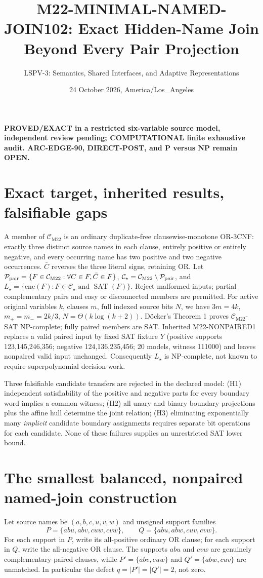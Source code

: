 \documentclass[11pt]{article}
\title{M22-MINIMAL-NAMED-JOIN102: Exact Hidden-Name Join Beyond Every Pair Projection}
\author{LSPV-3: Semantics, Shared Interfaces, and Adaptive Representations}
\date{24 October 2026, America/Los\_Angeles}
\newcommand{\CM}{\mathcal C_{\mathrm{M22}}}
\newcommand{\CS}{\mathcal C_\star}
\begin{document}
\maketitle
\begin{center}\textbf{PROVED/EXACT in a restricted six-variable source model, independent review pending; COMPUTATIONAL finite exhaustive audit. ARC-EDGE-90, DIRECT-POST, and P versus NP remain OPEN.}\end{center}

\section{Exact target, inherited results, falsifiable gaps}
A member of $\CM$ is an ordinary duplicate-free clausewise-monotone OR-3CNF: exactly three distinct source names in each clause, entirely positive or entirely negative, and every occurring name has two positive and two negative occurrences. $\bar C$ reverses the three literal signs, retaining OR. Let $\mathcal P_{\rm pair}=\{F\in\CM:\forall C\in F,\bar C\in F\}$, $\CS=\CM\setminus\mathcal P_{\rm pair}$, and $L_\star=\{\mathrm{enc}(F):F\in\CS\text{ and }\operatorname{SAT}(F)\}$. Reject malformed inputs; partial complementary pairs and easy or disconnected members are permitted. For active original variables $k$, clauses $m$, full indexed source bits $N$, we have $3m=4k$, $m_+=m_-=2k/3$, $N=\Theta(k\log(k+2))$. D\"ocker's Theorem 1 proves $\CM$-SAT NP-complete; fully paired members are SAT. Inherited M22-NONPAIRED1 replaces a valid paired input by fixed SAT fixture $Y$ (positive supports 123,145,246,356; negative 124,136,235,456; 20 models, witness 111000) and leaves nonpaired valid input unchanged. Consequently $L_\star$ is NP-complete, not known to require superpolynomial decision work.

Three falsifiable candidate transfers are rejected in the declared model: (H1) independent satisfiability of the positive and negative parts for every boundary word implies a common witness; (H2) all unary and binary boundary projections plus the affine hull determine the joint relation; (H3) eliminating exponentially many \emph{implicit} candidate boundary assignments requires separate bit operations for each candidate. None of these failures supplies an unrestricted SAT lower bound.

\section{The smallest balanced, nonpaired named-join construction}
Let source names be $(a,b,c,u,v,w)$ and unsigned support families
\[
 P=\{abu,abv,cuw,cvw\},\qquad Q=\{abu,abw,cuv,cvw\}.
\]
For each support in $P$, write its all-positive ordinary OR clause; for each support in $Q$, write the all-negative OR clause. The supports $abu$ and $cvw$ are genuinely complementary-paired clauses, while $P'=\{abv,cuw\}$ and $Q'=\{abw,cuv\}$ are unmatched. In particular the defect $q=|P'|=|Q'|=2$, not zero.
\end{document}
